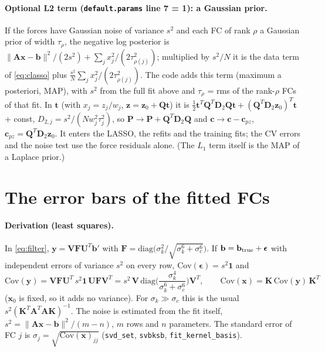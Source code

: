 \documentclass[11pt,a4paper]{article}
\newcommand{\bA}{\mathbf A}
\newcommand{\bD}{\mathbf D}
\newcommand{\bK}{\mathbf K}
\newcommand{\bP}{\mathbf P}
\newcommand{\bQ}{\mathbf Q}
\newcommand{\bU}{\mathbf U}
\newcommand{\bV}{\mathbf V}
\newcommand{\bb}{\mathbf b}
\newcommand{\bc}{\mathbf c}
\newcommand{\bt}{\mathbf t}
\newcommand{\bx}{\mathbf x}
\newcommand{\by}{\mathbf y}
\newcommand{\bz}{\mathbf z}
\newcommand{\code}[1]{\texttt{#1}}
\begin{document}
\paragraph{Optional L2 term (\code{default.params} line 7 = 1): a Gaussian prior.}\label{sec:l2} If the forces have Gaussian noise
of variance $s^2$ and each FC of rank $\rho$ a Gaussian prior of width $\tau_\rho$, the negative log posterior is
$\|\bA\bx-\bb\|^2/(2s^2)+\sum_jx_j^2/(2\tau_{\rho(j)}^2)$; multiplied by $s^2/N$ it is the data term of \eqref{eq:classo}
plus $\frac{s^2}N\sum_jx_j^2/(2\tau_{\rho(j)}^2)$. The code adds this term (maximum a posteriori, MAP), with $s^2$ from the full
fit above and $\tau_\rho$ = rms of the rank-$\rho$ FCs of that fit. In $\bt$ (with $x_j=z_j/w_j$, $\bz=\bz_0+\bQ\bt$) it is
$\tfrac12\bt^T\bQ^T\bD_2\bQ\bt+(\bQ^T\bD_2\bz_0)^T\bt$ + const, $D_{2,j}=s^2/(Nw_j^2\tau_j^2)$, so $\bP\to\bP+\bQ^T\bD_2\bQ$
and $\bc\to\bc-\bc_{pz}$, $\bc_{pz}=\bQ^T\bD_2\bz_0$. It enters the LASSO, the refits and the training fits; the CV errors and
the noise test use the force residuals alone. (The $L_1$ term itself is the MAP of a Laplace prior.)

\section{The error bars of the fitted FCs}\label{sec:errors}
\paragraph{Derivation (least squares).} In \eqref{eq:filter}, $\by=\bV\mathbf F\bU^T\bb'$ with $\mathbf F=\mathrm{diag}\big(\sigma_k^2/\sqrt{\sigma_k^6+\sigma_c^6}\big)$.
If $\bb=\bb_{\rm true}+\boldsymbol\epsilon$ with independent errors of variance $s^2$ on every row, $\mathrm{Cov}(\boldsymbol\epsilon)=s^2\mathbf 1$ and
\begin{equation}
\mathrm{Cov}(\by)=\bV\mathbf F\bU^T\,s^2\mathbf 1\,\bU\mathbf F\bV^T=s^2\,\bV\,\mathrm{diag}\Big(\frac{\sigma_k^4}{\sigma_k^6+\sigma_c^6}\Big)\bV^T,\qquad
\mathrm{Cov}(\bx)=\bK\,\mathrm{Cov}(\by)\,\bK^T
\end{equation}
($\bx_0$ is fixed, so it adds no variance). For $\sigma_k\gg\sigma_c$ this is the usual $s^2(\bK^T\bA^T\bA\bK)^{-1}$. The noise is
estimated from the fit itself, $s^2=\|\bA\bx-\bb\|^2/(m-n)$, $m$ rows and $n$ parameters. The standard error of FC $j$ is
$\sigma_j=\sqrt{\mathrm{Cov}(\bx)_{jj}}$ (\code{svd\_set}, \code{svbksb}, \code{fit\_kernel\_basis}).
\end{document}
